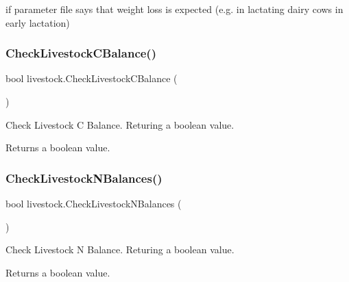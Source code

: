if parameter file says that weight loss is expected (e.\+g. in lactating dairy cows in early lactation) \mbox{\label{classlivestock_a4c255fb9cb3d61f425e85e4b7c1cbbbb}} 
\subsubsection{\texorpdfstring{CheckLivestockCBalance()}{CheckLivestockCBalance()}}
{\footnotesize\ttfamily bool livestock.\+Check\+Livestock\+C\+Balance (\begin{DoxyParamCaption}{ }\end{DoxyParamCaption})\hspace{0.3cm}{\ttfamily [inline]}}



Check Livestock C Balance. Returing a boolean value. 

\begin{DoxyReturn}{Returns}
a boolean value. 
\end{DoxyReturn}
\mbox{\label{classlivestock_a75c6de36dbd59f4636092f88c8c19798}} 
\subsubsection{\texorpdfstring{CheckLivestockNBalances()}{CheckLivestockNBalances()}}
{\footnotesize\ttfamily bool livestock.\+Check\+Livestock\+N\+Balances (\begin{DoxyParamCaption}{ }\end{DoxyParamCaption})\hspace{0.3cm}{\ttfamily [inline]}}



Check Livestock N Balance. Returing a boolean value. 

\begin{DoxyReturn}{Returns}
a boolean value. 
\end{DoxyReturn}
\mbox{\label{classlivestock_ac40dff6a0a45d6a86ed5348166bd9074}} 
